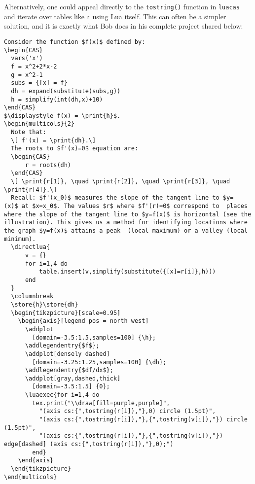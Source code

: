 \documentclass{article}
\begin{document}
Alternatively, one could appeal directly to the \texttt{tostring()} function in \texttt{luacas} and iterate over tables like \texttt{r} using Lua itself. This can often be a simpler solution, and it is exactly what Bob does in his complete project shared below:
\begin{verbatim}
Consider the function $f(x)$ defined by:
\begin{CAS}
  vars('x')
  f = x^2+2*x-2
  g = x^2-1
  subs = {[x] = f}
  dh = expand(substitute(subs,g))
  h = simplify(int(dh,x)+10)
\end{CAS}
$\displaystyle f(x) = \print{h}$.
\begin{multicols}{2}
  Note that: 
  \[ f'(x) = \print{dh}.\] 
  The roots to $f'(x)=0$ equation are:
  \begin{CAS}
      r = roots(dh)
  \end{CAS}
  \[ \print{r[1]}, \quad \print{r[2]}, \quad \print{r[3]}, \quad  \print{r[4]}.\] 
  Recall: $f'(x_0)$ measures the slope of the tangent line to $y=  (x)$ at $x=x_0$. The values $r$ where $f'(r)=0$ correspond to  places where the slope of the tangent line to $y=f(x)$ is horizontal (see the illustration). This gives us a method for identifying locations where the graph $y=f(x)$ attains a peak  (local maximum) or a valley (local minimum). 
  \directlua{
      v = {}
      for i=1,4 do 
          table.insert(v,simplify(substitute({[x]=r[i]},h)))
      end
  }
  \columnbreak 
  \store{h}\store{dh}
  \begin{tikzpicture}[scale=0.95]
    \begin{axis}[legend pos = north west]
      \addplot 
        [domain=-3.5:1.5,samples=100] {\h};
      \addlegendentry{$f$};
      \addplot[densely dashed] 
        [domain=-3.25:1.25,samples=100] {\dh};
      \addlegendentry{$df/dx$};
      \addplot[gray,dashed,thick]
        [domain=-3.5:1.5] {0};
      \luaexec{for i=1,4 do 
        tex.print("\\draw[fill=purple,purple]",
          "(axis cs:{",tostring(r[i]),"},0) circle (1.5pt)",
          "(axis cs:{",tostring(r[i]),"},{",tostring(v[i]),"}) circle (1.5pt)",
          "(axis cs:{",tostring(r[i]),"},{",tostring(v[i]),"}) edge[dashed] (axis cs:{",tostring(r[i]),"},0);")
        end}
    \end{axis}
  \end{tikzpicture}
\end{multicols}
\end{verbatim}
\end{document}
